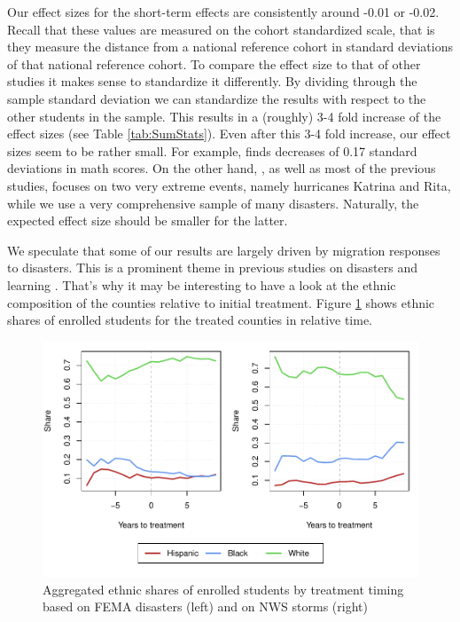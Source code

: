 Our effect sizes for the short-term effects are consistently around -0.01 or -0.02. Recall that these values are measured on the cohort standardized scale, that is they measure the distance from a national reference cohort in standard deviations of that national reference cohort. To compare the effect size to that of other studies it makes sense to standardize it differently. By dividing through the sample standard deviation we can standardize the results with respect to the other students in the sample. This results in a (roughly) 3-4 fold increase of the effect sizes (see Table \ref{tab:SumStats}). Even after this 3-4 fold increase, our effect sizes seem to be rather small. For example, \cite{Sacerdote_2012} finds decreases of 0.17 standard deviations in math scores. On the other hand, \cite{Sacerdote_2012}, as well as most of the previous studies, focuses on two very extreme events, namely hurricanes Katrina and Rita, while we use a very comprehensive sample of many disasters. Naturally, the expected effect size should be smaller for the latter.

We speculate that some of our results are largely driven by migration responses to disasters. This is a prominent theme in previous studies on disasters and learning \citep{Pane_2008, Sacerdote_2012}. That's why it may be interesting to have a look at the ethnic composition of the counties relative to initial treatment. Figure \ref{EthnicComposition} shows ethnic shares of enrolled students for the treated counties in relative time.

\begin{figure}[!h]
	\centering
	\includegraphics[scale=1]{"../Code & Data/EthnicComposition.pdf"}
	\caption{Aggregated ethnic shares of enrolled students by treatment timing based on FEMA disasters (left) and on NWS storms (right)}
	\label{EthnicComposition}
\end{figure}

